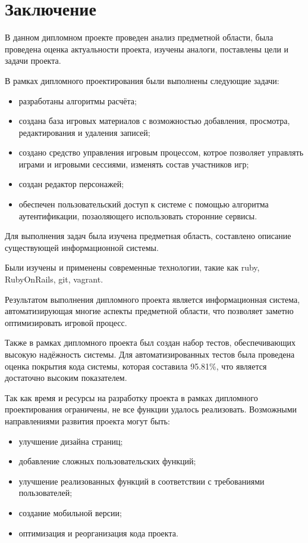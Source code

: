 \section*{Заключение}

В данном дипломном проекте проведен анализ предметной области, была проведена оценка актуальности проекта, изучены аналоги, поставлены цели и задачи проекта.

В рамках дипломного проектирования были выполнены следующие задачи:
\begin{itemize}
\item разработаны алгоритмы расчёта;
\item создана база игровых материалов с возможностью добавления, просмотра, редактирования и удаления записей;
\item создано средство управления игровым процессом, котрое позволяет управлять играми и игровыми сессиями, изменять состав участников игр;
\item создан редактор персонажей;
\item обеспечен пользовательский доступ к системе с помощью алгоритма аутентификации, позаоляющего использовать сторонние сервисы.
\end{itemize}

Для выполнения задач была изучена предметная область, составлено описание существующей информационной системы.

Были изучены и применены современные технологии, такие как ruby, RubyOnRails, git, vagrant.

Результатом выполнения дипломного проекта является информационная система, автоматизирующая многие аспекты предметной области, что позволяет заметно оптимизировать игровой процесс.

Также в рамках дипломного проекта был создан набор тестов, обеспечивающих высокую надёжность системы. Для автоматизированных тестов была проведена оценка покрытия кода системы, которая составила 95.81\%, что является достаточно высоким показателем.

Так как время и ресурсы на разработку проекта в рамках дипломного проектирования ограничены, не все функции удалось реализовать. Возможными направлениями развития проекта могут быть:
\begin{itemize}
\item улучшение дизайна страниц;
\item добавление сложных пользовательских функций;
\item улучшение реализованных функций в соответствии с требованиями пользователей;
\item создание мобильной версии;
\item оптимизация и реорганизация кода проекта.
\end{itemize}


\pagebreak

